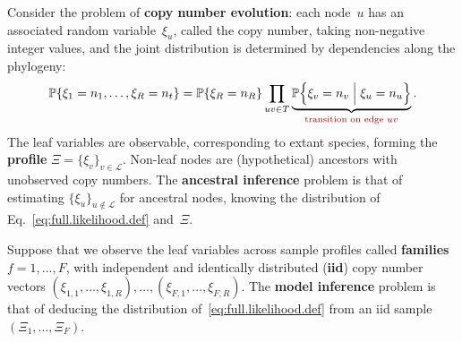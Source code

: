 \documentclass{elsarticle}
\newcommand{\CB}[1]{\textcolor{webbrown}{#1}}
\newcommand{\condgen}[6]{{#1}#2 #5 #3 #6 #4}
\newcommand{\PROB}{\mathbb{P}}
\newcommand{\Probcmd}[2]{\condgen{\PROB}{\Bigl\{}{\Bigm|}{\Bigr\}}{#1}{#2}}
\newcommand{\definehere}[1]{\textcolor{webbrown}{\bf #1}}
\newcommand{\nx}{u}
\newcommand{\ny}{v}
\newcommand{\troot}{R}
\begin{document}
Consider the problem of \definehere{copy number evolution}: 
each node~$\nx$ has an associated random variable~$\xi_{\nx}$, 
called the copy number, taking non-negative 
integer values, and the joint distribution is determined 
by dependencies along the phylogeny: 
\begin{equation}\label{eq:full.likelihood.def}
\PROB\{\xi_1=n_1,\dotsc, \xi_{\troot}=n_t\} 
= \PROB\{\xi_{\troot} =n_{\troot} \} \prod_{\nx\ny\in T} \underbrace{\Probcmd{\xi_{\ny}=n_{\ny}}{\xi_{\nx}=n_{\nx}}}_{\CB{\text{transition on edge $\nx\ny$}}}.
\end{equation}
The leaf variables are observable, corresponding to extant species,
forming the \definehere{profile}
$
\Xi = \{\xi_{\ny}\}_{\ny\in \mathcal{L}}
$.
Non-leaf nodes are (hypothetical) ancestors with unobserved copy numbers. 
The \definehere{ancestral inference} problem is that of 
estimating $\{\xi_{\nx}\}_{\nx\not\in\mathcal{L}}$ for ancestral nodes, knowing the 
distribution of Eq.~\eqref{eq:full.likelihood.def} and~$\Xi$.  

Suppose that we observe the leaf variables across 
sample profiles called \definehere{families} $f=1,\dotsc,F$, 
with independent and identically distributed (\definehere{iid}) 
copy number vectors $(\xi_{1,1},\dotsc,\xi_{1,R}),
\dotsc,(\xi_{F,1},\dotsc,\xi_{F,R})$.  
The \definehere{model inference} problem is that of deducing   
the distribution of~\eqref{eq:full.likelihood.def}
from an iid sample $(\Xi_1,\dotsc, \Xi_F)$. 
\end{document}
